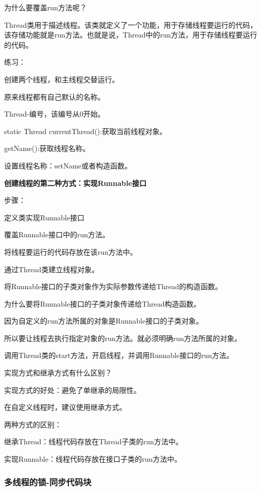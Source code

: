 \documentclass[UTF8]{ctexart}
\begin{document}
为什么要覆盖run方法呢？

Thread类用于描述线程。该类就定义了一个功能，用于存储线程要运行的代码，该存储功能就是run方法。也就是说，Thread中的run方法，用于存储线程要运行的代码。



练习：

创建两个线程，和主线程交替运行。

原来线程都有自己默认的名称。

Thread-编号，该编号从0开始。

static Thread currentThread():获取当前线程对象。

getName():获取线程名称。

设置线程名称：setName或者构造函数。



\textbf{创建线程的第二种方式：实现Runnable接口}

步骤：

\textbullet 定义类实现Runnable接口

\textbullet 覆盖Runnable接口中的run方法。

\qquad 将线程要运行的代码存放在该run方法中。

\textbullet 通过Thread类建立线程对象。

\textbullet 将Runnable接口的子类对象作为实际参数传递给Thread的构造函数。

\qquad 为什么要将Runnable接口的子类对象传递给Thread构造函数。

\qquad 因为自定义的run方法所属的对象是Runnable接口的子类对象。

\qquad 所以要让线程去执行指定对象的run方法。就必须明确run方法所属的对象。

\textbullet 调用Thread类的start方法，开启线程，并调用Runnable接口的run方法。

实现方式和继承方式有什么区别？

实现方式的好处：避免了单继承的局限性。

在自定义线程时，建议使用继承方式。

两种方式的区别：

继承Thread：线程代码存放在Thread子类的run方法中。

实现Runnable：线程代码存放在接口子类的run方法中。

\subsubsection{多线程的锁-同步代码块}
\end{document}
